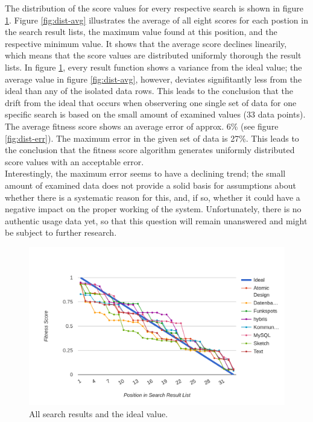 The distribution of the score values for every respective search is shown in figure \ref{fig:dist-raw}.
Figure \ref{fig:dist-avg} illustrates the average of all eight scores for each postion in the search result lists, the maximum value found at this position, and the respective minimum value.
It shows that the average score declines linearily, which means that the score values are distributed uniformly thorough the result lists. In figure \ref{fig:dist-raw}, every result function shows a variance from the ideal value; the average value in figure \ref{fig:dist-avg}, however, deviates signifitantly less from the ideal than any of the isolated data rows. This leads to the conclusion that the drift from the ideal that occurs when observering one single set of data for one specific search is based on the small amount of examined values (33 data points). The average fitness score shows an average error of approx. 6\% (see figure \ref{fig:dist-err}). The maximum error in the given set of data is 27\%.
This leads to the conclusion that the fitness score algorithm generates uniformly distributed score values with an acceptable error.\\
Interestingly, the maximum error seems to have a declining trend; the small amount of examined data does not provide a solid basis for assumptions about whether there is a systematic reason for this, and, if so, whether it could have a negative impact on the proper working of the system. Unfortunately, there is no authentic usage data yet, so that this question will remain unanswered and might be subject to further research.

\begin{figure}[H]
    \centering
    \includegraphics[width=\textwidth]{images/dist_raw.png}
    \caption[Diagram: Fitness Score Distribution (Raw)]{All search results and the ideal value.}
    \label{fig:dist-raw}
\end{figure}

